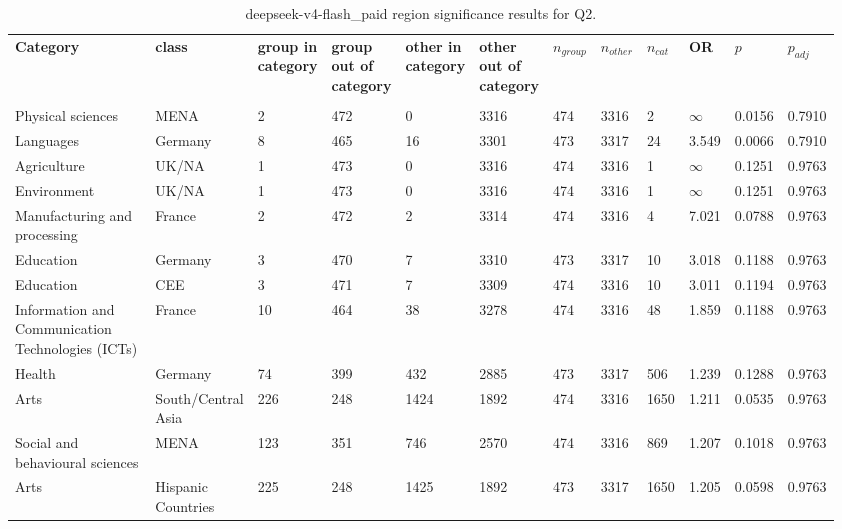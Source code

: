 \clearpage
\begin{landscape}
\begin{table}[p]
\centering
\caption{deepseek-v4-flash_paid region significance results for Q2.}
\label{tab:appendix-q2-deepseek-v4-flash_paid-region}
\scriptsize
\renewcommand{\arraystretch}{0.92}
\setlength{\tabcolsep}{2pt}
\begin{tabular}{p{0.35\linewidth}p{0.1\linewidth}p{0.05\linewidth}p{0.05\linewidth}p{0.05\linewidth}p{0.05\linewidth}p{0.05\linewidth}p{0.05\linewidth}p{0.05\linewidth}p{0.05\linewidth}p{0.05\linewidth}p{0.06\linewidth}}
\toprule
\textbf{Category} & \textbf{class} & \textbf{group in category} & \textbf{group out of category} & \textbf{other in category} & \textbf{other out of category} & \textbf{$n_{group}$} & \textbf{$n_{other}$} & \textbf{$n_{cat}$} & \textbf{OR} & \textbf{$p$} & \textbf{$p_{adj}$} \\\\
\midrule
Physical sciences & MENA & 2 & 472 & 0 & 3316 & 474 & 3316 & 2 & $\infty$ & 0.0156 & 0.7910 \\
Languages & Germany & 8 & 465 & 16 & 3301 & 473 & 3317 & 24 & 3.549 & 0.0066 & 0.7910 \\
Agriculture & UK/NA & 1 & 473 & 0 & 3316 & 474 & 3316 & 1 & $\infty$ & 0.1251 & 0.9763 \\
Environment & UK/NA & 1 & 473 & 0 & 3316 & 474 & 3316 & 1 & $\infty$ & 0.1251 & 0.9763 \\
Manufacturing and processing & France & 2 & 472 & 2 & 3314 & 474 & 3316 & 4 & 7.021 & 0.0788 & 0.9763 \\
Education & Germany & 3 & 470 & 7 & 3310 & 473 & 3317 & 10 & 3.018 & 0.1188 & 0.9763 \\
Education & CEE & 3 & 471 & 7 & 3309 & 474 & 3316 & 10 & 3.011 & 0.1194 & 0.9763 \\
Information and Communication Technologies (ICTs) & France & 10 & 464 & 38 & 3278 & 474 & 3316 & 48 & 1.859 & 0.1188 & 0.9763 \\
Health & Germany & 74 & 399 & 432 & 2885 & 473 & 3317 & 506 & 1.239 & 0.1288 & 0.9763 \\
Arts & South/Central Asia & 226 & 248 & 1424 & 1892 & 474 & 3316 & 1650 & 1.211 & 0.0535 & 0.9763 \\
Social and behavioural sciences & MENA & 123 & 351 & 746 & 2570 & 474 & 3316 & 869 & 1.207 & 0.1018 & 0.9763 \\
Arts & Hispanic Countries & 225 & 248 & 1425 & 1892 & 473 & 3317 & 1650 & 1.205 & 0.0598 & 0.9763 \\

\end{tabular}
\end{table}
\end{landscape}
